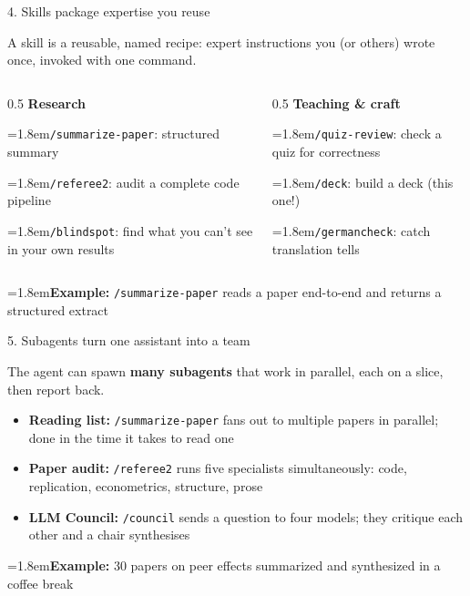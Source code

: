 \documentclass[aspectratio=169, 11pt, t]{beamer}
\newcommand{\hint}[2]{\par\noindent\hangindent=1.8em\hangafter=1\textcolor{seeblau}{#1}\quad #2\par}
\begin{document}
\begin{frame}{4. Skills package expertise you reuse}

\small
A skill is a reusable, named recipe: expert instructions you (or others) wrote once, invoked with one command.

\vfill
\begin{columns}[T]
  \begin{column}{0.5\textwidth}
    \textbf{Research}\\[0.3em]
    \hint{\faBookOpen}{\texttt{/summarize-paper}: structured summary}
    \hint{\faCheckDouble}{\texttt{/referee2}: audit a complete code pipeline}
    \hint{\faGlasses}{\texttt{/blindspot}: find what you can't see in your own results}
  \end{column}
  \begin{column}{0.5\textwidth}
    \textbf{Teaching \& craft}\\[0.3em]
    \hint{\faChalkboardTeacher}{\texttt{/quiz-review}: check a quiz for correctness}
    \hint{\faLayerGroup}{\texttt{/deck}: build a deck (this one!)}
    \hint{\faLanguage}{\texttt{/germancheck}: catch translation tells}
  \end{column}
\end{columns}

\vfill
\hint{\faGraduationCap}{\textbf{Example:} \texttt{/summarize-paper} reads a paper end-to-end and returns a structured extract}

\end{frame}


\begin{frame}{5. Subagents turn one assistant into a team}

\small
The agent can spawn \textbf{many subagents} that work in parallel, each on a slice, then report back. 



\vfill
\begin{itemize}
  \item \textbf{Reading list:} \texttt{/summarize-paper} fans out to multiple papers in parallel; done in the time it takes to read one
  \item \textbf{Paper audit:} \texttt{/referee2} runs five specialists simultaneously: code, replication, econometrics, structure, prose
  \item \textbf{LLM Council:} \texttt{/council} sends a question to four models; they critique each other and a chair synthesises
\end{itemize}

\vfill
\hint{\faGraduationCap}{\textbf{Example:} 30 papers on peer effects summarized and synthesized in a coffee break}

\end{frame}
\end{document}
